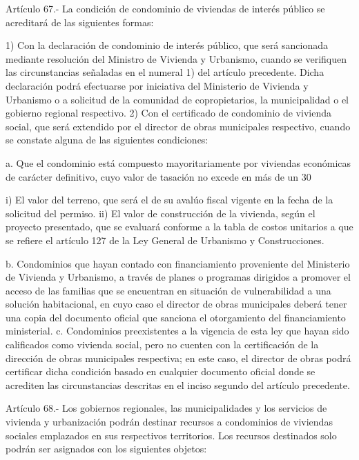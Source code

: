      
    Artículo 67.- La condición de condominio de viviendas de interés público se acreditará de las siguientes formas:
     
    1) Con la declaración de condominio de interés público, que será sancionada mediante resolución del Ministro de Vivienda y Urbanismo, cuando se verifiquen las circunstancias señaladas en el numeral 1) del artículo precedente. Dicha declaración podrá efectuarse por iniciativa del Ministerio de Vivienda y Urbanismo o a solicitud de la comunidad de copropietarios, la municipalidad o el gobierno regional respectivo.
    2) Con el certificado de condominio de vivienda social, que será extendido por el director de obras municipales respectivo, cuando se constate alguna de las siguientes condiciones:
     
    a. Que el condominio está compuesto mayoritariamente por viviendas económicas de carácter definitivo, cuyo valor de tasación no excede en más de un 30%
     
    i) El valor del terreno, que será el de su avalúo fiscal vigente en la fecha de la solicitud del permiso.
    ii) El valor de construcción de la vivienda, según el proyecto presentado, que se evaluará conforme a la tabla de costos unitarios a que se refiere el artículo 127 de la Ley General de Urbanismo y Construcciones.
     
    b. Condominios que hayan contado con financiamiento proveniente del Ministerio de Vivienda y Urbanismo, a través de planes o programas dirigidos a promover el acceso de las familias que se encuentran en situación de vulnerabilidad a una solución habitacional, en cuyo caso el director de obras municipales deberá tener una copia del documento oficial que sanciona el otorgamiento del financiamiento ministerial.
    c. Condominios preexistentes a la vigencia de esta ley que hayan sido calificados como vivienda social, pero no cuenten con la certificación de la dirección de obras municipales respectiva; en este caso, el director de obras podrá certificar dicha condición basado en cualquier documento oficial donde se acrediten las circunstancias descritas en el inciso segundo del artículo precedente.
     
    Artículo 68.- Los gobiernos regionales, las municipalidades y los servicios de vivienda y urbanización podrán destinar recursos a condominios de viviendas sociales emplazados en sus respectivos territorios.
    Los recursos destinados solo podrán ser asignados con los siguientes objetos:
     
